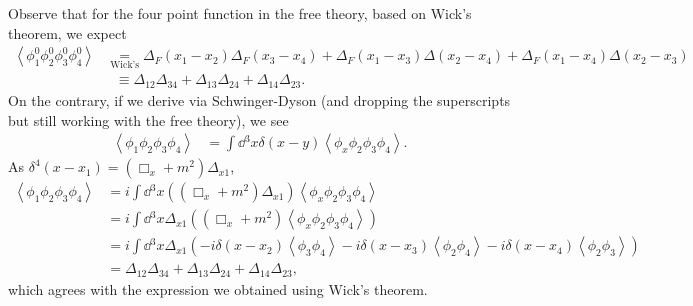 \begin{example}
    Observe that for the four point function in the free theory, based on Wick's theorem, we expect
    \begin{align}
        \left<\phi_1^{0} \phi_2^{0} \phi_3^{0} \phi_4^{0} \right> &\underset{\text{Wick's}}{=} \Delta_{F} \left( x_1 - x_2 \right) \Delta_{F}\left( x_3 - x_4 \right) + \Delta_F \left( x_1 - x_3 \right) \Delta \left( x_2 - x_4 \right) + \Delta_F \left( x_1 - x_4 \right) \Delta \left( x_2 - x_3 \right) \nonumber \\
        &~~\,\equiv \Delta_{12} \Delta_{34} + \Delta_{13} \Delta_{24} + \Delta_{14} \Delta_{23}
    .\end{align}
    On the contrary, if we derive via Schwinger-Dyson (and dropping the superscripts but still working with the free theory), we see
    \begin{align}
        \left< \phi_1 \phi_2 \phi_3 \phi_4  \right>&= \int \dd{^{3}x} \delta \left( x - y \right) \left< \phi_x \phi_2 \phi_3 \phi_4\right> 
    .\end{align}
    As $\delta^{4}\left( x - x_1 \right) = \left( \Box_x + m^2 \right)  \Delta_{x1}$,
    \begin{align}
        \left< \phi_1 \phi_2 \phi_3 \phi_4  \right> &= i\int \dd{^{3}x} \left( \left( \Box_x + m^2 \right)  \Delta_{x 1} \right)  \left< \phi_x \phi_2 \phi_3 \phi_4\right>  \\
        &= i\int \dd{^{3}x} \Delta_{x 1}\left( \left( \Box_x + m^2 \right)     \left< \phi_x \phi_2 \phi_3 \phi_4\right> \right) \\
        &= i\int \dd{^{3}x} \Delta_{x 1} \left( -i \delta \left( x - x_2 \right) \left<\phi_3 \phi_4 \right> - i \delta \left( x - x_3 \right) \left<\phi_2 \phi_4 \right> - i \delta \left( x - x_4 \right) \left<\phi_2 \phi_3 \right> \right)     \\
        &= \Delta_{12} \Delta_{34} + \Delta_{13} \Delta_{24} + \Delta_{14} \Delta_{23} 
    ,\end{align}
    which agrees with the expression we obtained using Wick's theorem.
\end{example}

